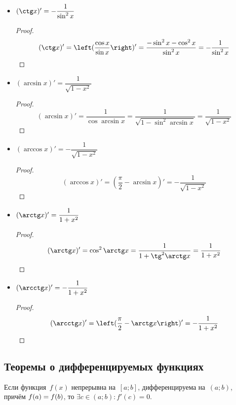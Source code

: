\begin{itemize}
	\item $(\ctg x)' = -\dfrac1{\sin^2 x}$
	\begin{proof}
	\begin{equation*}
	(\ctg x)' =
	\left( \frac{\cos x}{\sin x} \right)' =
	\frac{-\sin^2 x - \cos^2 x}{\sin^2 x} =
	-\frac1{\sin^2 x}
	\end{equation*}
	\end{proof}
	
	\item $(\arcsin x)' = \dfrac1{\sqrt{1 - x^2}}$
	\begin{proof}
	\begin{equation*}
	(\arcsin x)' =
	\frac1{\cos \arcsin x} =
	\frac1{\sqrt{1 - \sin^2 \arcsin x}} =
	\frac1{\sqrt{1 - x^2}}
	\end{equation*}
	\end{proof}
	
	\item $(\arccos x)' = -\dfrac1{\sqrt{1 - x^2}}$
	\begin{proof}
	\begin{equation*}
	(\arccos x)' =
	\left( \frac\pi{2} - \arcsin x \right)' =
	-\frac1{\sqrt{1 - x^2}}
	\end{equation*}
	\end{proof}
	
	\item $(\arctg x)' = \dfrac1{1 + x^2}$
	\begin{proof}
	\begin{equation*}
	(\arctg x)' =
	\cos^2 \arctg x =
	\frac1{1 + \tg^2 \arctg x} =
	\frac1{1 + x^2}
	\end{equation*}
	\end{proof}
	
	\item $(\arcctg x)' = -\dfrac1{1 + x^2}$
	\begin{proof}
	\begin{equation*}
	(\arcctg x)' =
	\left( \frac\pi{2} - \arctg x \right)' =
	-\frac1{1 + x^2}
	\end{equation*}
	\end{proof}
\end{itemize}

\subsection{Теоремы о дифференцируемых функциях}
\begin{theorem}[Ролля]
Если функция~$f(x)$ непрерывна на~$[a; b]$, дифференцируема на~$(a; b)$, причём $f(a) \opbr= f(b)$, то $\exists c \in (a; b) \colon f'(c) = 0$.
\end{theorem}

